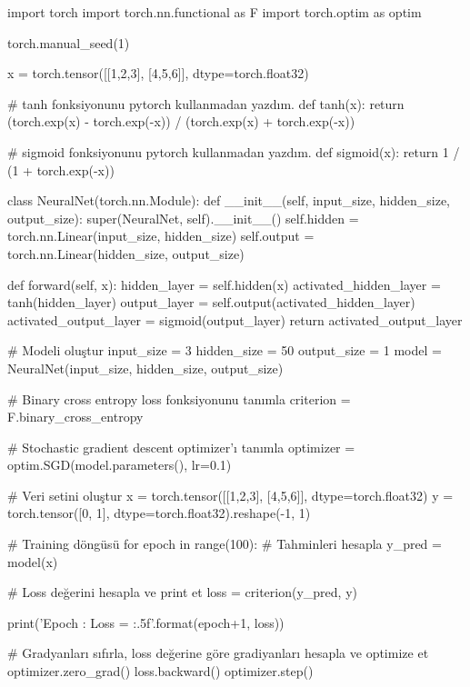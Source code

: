 \documentclass[11pt]{article}
\begin{document}
\begin{python}
import torch
import torch.nn.functional as F
import torch.optim as optim

torch.manual_seed(1)

x = torch.tensor([[1,2,3], [4,5,6]], dtype=torch.float32)

# tanh fonksiyonunu pytorch kullanmadan yazdım.
def tanh(x):
    return (torch.exp(x) - torch.exp(-x)) / (torch.exp(x) + torch.exp(-x))

# sigmoid fonksiyonunu pytorch kullanmadan yazdım.
def sigmoid(x):
    return 1 / (1 + torch.exp(-x))

class NeuralNet(torch.nn.Module):
    def __init__(self, input_size, hidden_size, output_size):
        super(NeuralNet, self).__init__()
        self.hidden = torch.nn.Linear(input_size, hidden_size)
        self.output = torch.nn.Linear(hidden_size, output_size)

    def forward(self, x):
        hidden_layer = self.hidden(x)
        activated_hidden_layer = tanh(hidden_layer)
        output_layer = self.output(activated_hidden_layer)
        activated_output_layer = sigmoid(output_layer)
        return activated_output_layer

# Modeli oluştur
input_size = 3
hidden_size = 50
output_size = 1
model = NeuralNet(input_size, hidden_size, output_size)

# Binary cross entropy loss fonksiyonunu tanımla
criterion = F.binary_cross_entropy

# Stochastic gradient descent optimizer'ı tanımla
optimizer = optim.SGD(model.parameters(), lr=0.1)

# Veri setini oluştur
x = torch.tensor([[1,2,3], [4,5,6]], dtype=torch.float32)
y = torch.tensor([0, 1], dtype=torch.float32).reshape(-1, 1)

# Training döngüsü
for epoch in range(100):
    # Tahminleri hesapla
    y_pred = model(x)

    # Loss değerini hesapla ve print et
    loss = criterion(y_pred, y)
    
    print('Epoch {}: Loss = {:.5f}'.format(epoch+1, loss))

    # Gradyanları sıfırla, loss değerine göre gradiyanları hesapla ve optimize et
    optimizer.zero_grad()
    loss.backward()
    optimizer.step()
\end{python}
\end{document}
